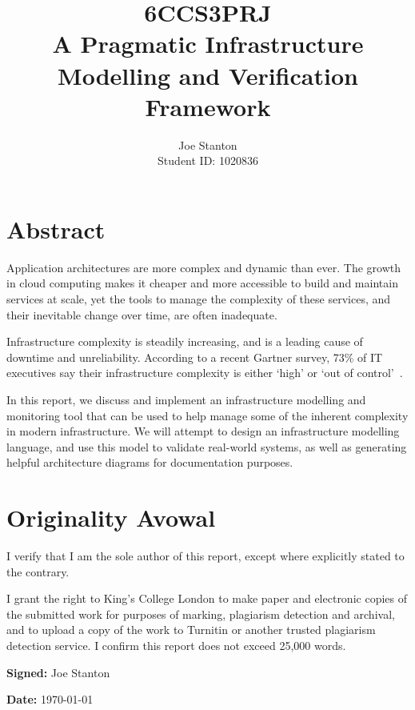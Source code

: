 \documentclass{cshonours}
\title{6CCS3PRJ \\\vspace{0.5cm}
  A Pragmatic Infrastructure Modelling and Verification Framework}
\author{Joe Stanton\\\vspace{0.5cm}
  Student ID: 1020836
}
\begin{document}
\maketitle

\chapter*{Abstract}



Application architectures are more complex and dynamic than ever. The growth in cloud computing makes it cheaper and more accessible to build and maintain services at scale, yet the tools to manage the complexity of these services, and their inevitable change over time, are often inadequate.

 Infrastructure complexity is steadily increasing, and is a leading cause of downtime and unreliability. According to a recent Gartner survey, 73\% of IT executives say their infrastructure complexity is either `high' or `out of control'~\cite{Gartner2013}.

In this report, we discuss and implement an infrastructure modelling and monitoring tool that can be used to help manage some of the inherent complexity in modern infrastructure. We will attempt to design an infrastructure modelling language, and use this model to validate real-world systems, as well as generating helpful architecture diagrams for documentation purposes.

\chapter*{Originality Avowal}
I verify that I am the sole author of this report, except where explicitly stated to the contrary.

I grant the right to King’s College London to make paper and electronic copies of the submitted work for purposes of marking, plagiarism detection and archival, and to upload a copy of the work to Turnitin or another trusted plagiarism detection service. I confirm this report does not exceed 25,000 words.

\textbf{Signed:} Joe Stanton

\textbf{Date:} \today
\end{document}
